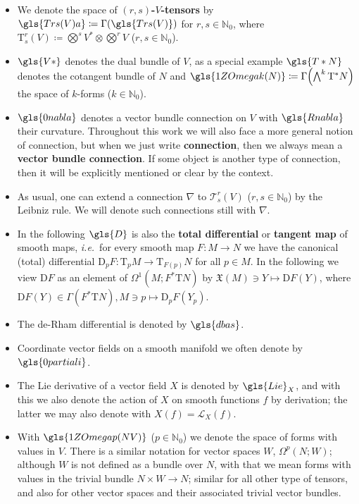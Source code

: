 \begin{itemize}
	\item We denote the space of \textbf{$(r,s)$-$V$-tensors} by $\gls{Trs(V)a} \coloneqq \Gamma\mleft(\gls{Trs(V)}\mright)$ for $r,s \in \mathds{N}_0$, where $\mathrm{T}^r_s(V) \coloneqq \bigotimes^s V^* \otimes \bigotimes^r V$ ($r, s \in \mathds{N}_0$).
	\item $\gls{V*}$ denotes the dual bundle of $V$, as a special example $\gls{T*N}$ denotes the cotangent bundle of $N$ and $\gls{1ZOmegak(N)} \coloneqq \Gamma\mleft(\bigwedge^k \mathrm{T}^*N\mright)$ the space of $k$-forms ($k \in \mathds{N}_0$).
	\item $\gls{0nabla}$ denotes a vector bundle connection on $V$ with $\gls{Rnabla}$ their curvature. Throughout this work we will also face a more general notion of connection, but when we just write \textbf{connection}, then we always mean a \textbf{vector bundle connection}. If some object is another type of connection, then it will be explicitly mentioned or clear by the context.
	\item As usual, one can extend a connection $\nabla$ to $\mathcal{T}^r_s(V)$ ($r, s\in \mathbb{N}_0$) by the Leibniz rule. We will denote such connections still with $\nabla$.
	\item In the following $\gls{D}$ is also the \textbf{total differential} or \textbf{tangent map} of smooth maps, \textit{i.e.}~for every smooth map $F: M \to N$ we have the canonical (total) differential $\mathrm{D}_pF: \mathrm{T}_pM \to \mathrm{T}_{F(p)}N$ for all $p\in M$. In the following we view $\mathrm{D}F$ as an element of $\Omega^1(M; F^*\mathrm{T}N)$ by $\mathfrak{X}(M) \ni Y \mapsto \mathrm{D}F(Y)$, where $\mathrm{D}F(Y) \in \Gamma(F^*\mathrm{T}N), M \ni p \mapsto \mathrm{D}_pF(Y_p)$.
	\item The de-Rham differential is denoted by $\gls{dbas}$.
	\item Coordinate vector fields on a smooth manifold we often denote by $\gls{0partiali}$.
	\item The Lie derivative of a vector field $X$ is denoted by $\gls{Lie}_X$, and with this we also denote the action of $X$ on smooth functions $f$ by derivation; the latter we may also denote with $X(f) = \mathcal{L}_X(f)$.
	\item With $\gls{1ZOmegap(NV)}$ ($p\in \mathbb{N}_0$) we denote the space of forms with values in $V$. There is a similar notation for vector spaces $W$, $\Omega^p(N; W)$; although $W$ is not defined as a bundle over $N$, with that we mean forms with values in the trivial bundle $N \times W \to N$; similar for all other type of tensors, and also for other vector spaces and their associated trivial vector bundles.

\end{itemize}

